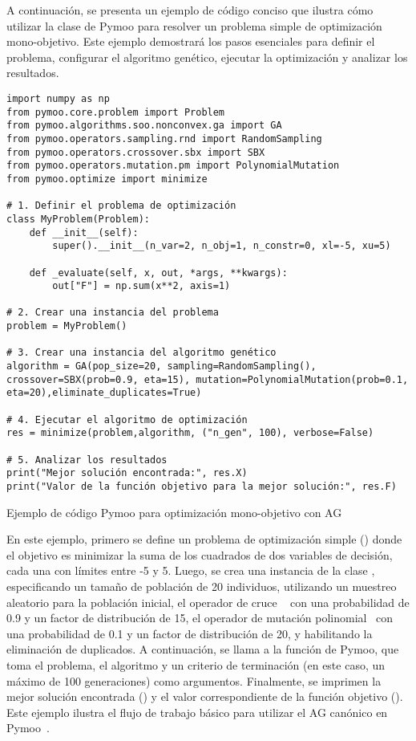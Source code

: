 A continuación, se presenta un ejemplo de código conciso que ilustra cómo utilizar la clase \texttt{} de Pymoo para resolver un problema simple de optimización mono-objetivo. Este ejemplo demostrará los pasos esenciales para definir el problema, configurar el algoritmo genético, ejecutar la optimización y analizar los resultados.
\newpage
\begin{listing}[H]
\begin{verbatim}
import numpy as np
from pymoo.core.problem import Problem
from pymoo.algorithms.soo.nonconvex.ga import GA
from pymoo.operators.sampling.rnd import RandomSampling
from pymoo.operators.crossover.sbx import SBX
from pymoo.operators.mutation.pm import PolynomialMutation
from pymoo.optimize import minimize

# 1. Definir el problema de optimización
class MyProblem(Problem):
    def __init__(self):
        super().__init__(n_var=2, n_obj=1, n_constr=0, xl=-5, xu=5)

    def _evaluate(self, x, out, *args, **kwargs):
        out["F"] = np.sum(x**2, axis=1)

# 2. Crear una instancia del problema
problem = MyProblem()

# 3. Crear una instancia del algoritmo genético
algorithm = GA(pop_size=20, sampling=RandomSampling(), crossover=SBX(prob=0.9, eta=15), mutation=PolynomialMutation(prob=0.1, eta=20),eliminate_duplicates=True)

# 4. Ejecutar el algoritmo de optimización
res = minimize(problem,algorithm, ("n_gen", 100), verbose=False)

# 5. Analizar los resultados
print("Mejor solución encontrada:", res.X)
print("Valor de la función objetivo para la mejor solución:", res.F)
\end{verbatim}
\caption{Ejemplo de código Pymoo para optimización mono-objetivo con AG}
\label{lst:pymoo_example}
\end{listing}



En este ejemplo, primero se define un problema de optimización simple (\texttt{}) donde el objetivo es minimizar la suma de los cuadrados de dos variables de decisión, cada una con límites entre -5 y 5. Luego, se crea una instancia de la clase \texttt{}, especificando un tamaño de población de 20 individuos, utilizando un muestreo aleatorio para la población inicial, el operador de cruce \texttt{}~\cite{deb1995} con una probabilidad de 0.9 y un factor de distribución de 15, el operador de mutación polinomial~\cite{deb1996} con una probabilidad de 0.1 y un factor de distribución de 20, y habilitando la eliminación de duplicados. A continuación, se llama a la función \texttt{} de Pymoo, que toma el problema, el algoritmo y un criterio de terminación (en este caso, un máximo de 100 generaciones) como argumentos. Finalmente, se imprimen la mejor solución encontrada (\texttt{}) y el valor correspondiente de la función objetivo (\texttt{}). Este ejemplo ilustra el flujo de trabajo básico para utilizar el AG canónico en Pymoo~\cite{blank2020}.

